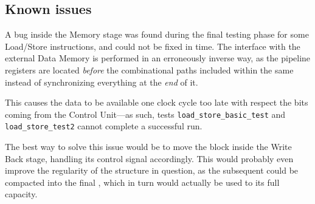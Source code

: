 \subsection{Known issues}
A bug inside the Memory stage was found during the final testing phase for some Load/Store instructions, and could not be fixed in time. The interface with the external Data Memory is performed in an erroneously inverse way, as the pipeline registers are located \emph{before} the combinational paths included within the same instead of synchronizing everything at the \emph{end} of it.

This causes the data to be available one clock cycle too late with respect the bits coming from the Control Unit—as such, tests \texttt{load\_store\_basic\_test} and \texttt{load\_store\_test2} cannot complete a successful run.

The best way to solve this issue would be to move the  block inside the Write Back stage, handling its control signal accordingly. This would probably even improve the regularity of the structure in question, as the subsequent  could be compacted into the final , which in turn would actually be used to its full capacity.